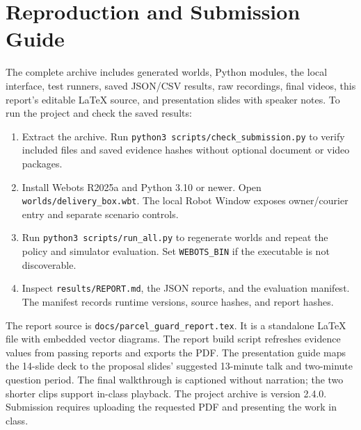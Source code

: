 \documentclass[conference,letterpaper]{IEEEtran}
\newcommand{\code}[1]{\texttt{\small #1}}
\newcommand{\ReportVersion}{2.4.0}
\begin{document}
\balance
\appendices
\section{Reproduction and Submission Guide}
\label{sec:reproduce}
The complete archive includes generated worlds, Python modules, the local interface, test runners, saved JSON/CSV results, raw recordings, final videos, this report's editable LaTeX source, and presentation slides with speaker notes. To run the project and check the saved results:
\begin{enumerate}
\item Extract the archive. Run \code{python3 scripts/\allowbreak check\_submission.py} to verify included files and saved evidence hashes without optional document or video packages.
\item Install Webots R2025a and Python 3.10 or newer. Open \code{worlds/delivery\_box.wbt}. The local Robot Window exposes owner/courier entry and separate scenario controls.
\item Run \code{python3 scripts/\allowbreak run\_all.py} to regenerate worlds and repeat the policy and simulator evaluation. Set \code{WEBOTS\_BIN} if the executable is not discoverable.
\item Inspect \code{results/REPORT.md}, the JSON reports, and the evaluation manifest. The manifest records runtime versions, source hashes, and report hashes.
\end{enumerate}

The report source is \code{docs/\allowbreak parcel\_guard\_report.tex}. It is a standalone LaTeX file with embedded vector diagrams. The report build script refreshes evidence values from passing reports and exports the PDF. The presentation guide maps the 14-slide deck to the proposal slides' suggested 13-minute talk and two-minute question period. The final walkthrough is captioned without narration; the two shorter clips support in-class playback. The project archive is version \ReportVersion. Submission requires uploading the requested PDF and presenting the work in class.
\end{document}

